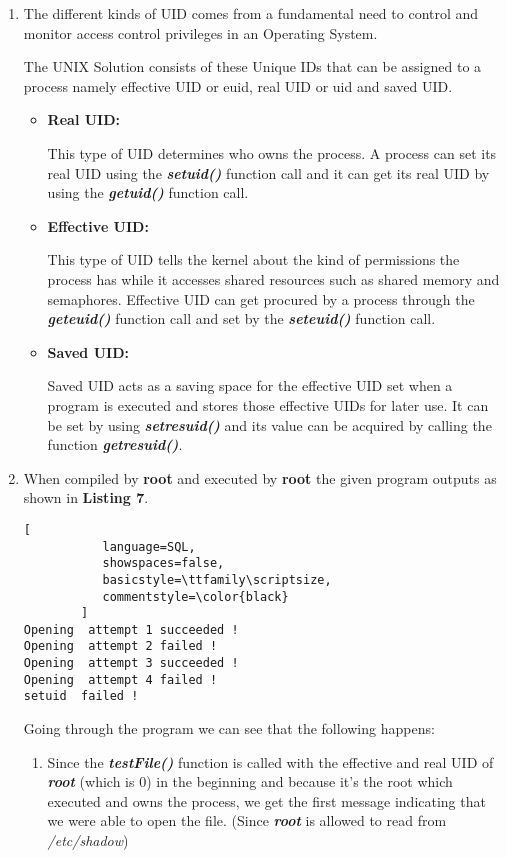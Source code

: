 \documentclass[10pt,a4paper,oneside]{article}
\begin{document}
\begin{enumerate}
\item The different kinds of UID comes from a fundamental need to control and monitor access control privileges in an Operating System.
\par
The UNIX Solution consists of these Unique IDs that can be assigned to a process namely effective UID or euid, real UID or uid and saved UID.

\begin{itemize}
\item \textbf{Real UID:}

This type of UID determines who owns the process. A process can set its real UID using the \textbf{\textit{setuid()}} function call and it can get its real UID by using the \textbf{\textit{getuid()}} function call.

\item \textbf{Effective UID:}

This type of UID tells the kernel about the kind of permissions the process has while it accesses shared resources such as shared memory and semaphores. Effective UID can get procured by a process through the \textbf{\textit{geteuid()}} function call and set by the \textbf{\textit{seteuid()}} function call.

\item \textbf{Saved UID:}

Saved UID acts as a saving space for the effective UID set when a program is executed and stores those effective UIDs for later use. It can be set by using \textbf{\textit{setresuid()}} and its value can be acquired by calling the function \textbf{\textit{getresuid()}}.
\end{itemize}

\item When compiled by \textbf{root} and executed by \textbf{root} the given program outputs as shown in \textbf{Listing 7}.

\begin{lstlisting}[
           language=SQL,
           showspaces=false,
           basicstyle=\ttfamily\scriptsize,
           commentstyle=\color{black}
        ]
Opening  attempt 1 succeeded !
Opening  attempt 2 failed !
Opening  attempt 3 succeeded !
Opening  attempt 4 failed !
setuid  failed !
\end{lstlisting}

Going through the program we can see that the following happens:
\begin{enumerate}
\item Since the \textbf{\textit{testFile()}} function is called with the effective and real UID of \textbf{\textit{root}} (which is 0) in the beginning and because it's the root which executed and owns the process, we get the first message indicating that we were able to open the file. (Since \textbf{\textit{root}} is allowed to read from \textit{/etc/shadow})


\end{enumerate}
\end{enumerate}
\end{document}
